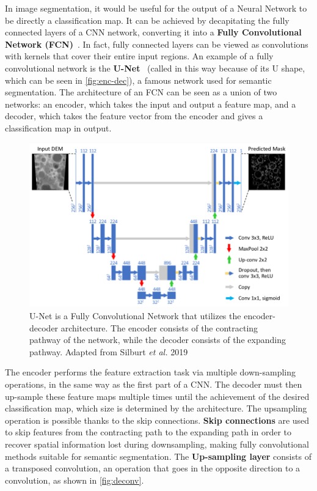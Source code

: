 \noindent In image segmentation, it would be useful for the output of a Neural Network to be directly a classification map.
It can be achieved by decapitating the fully connected layers of a CNN network, converting it into a \textbf{Fully Convolutional Network (FCN)}~\cite{long2015fully}.
In fact, fully connected layers can be viewed as convolutions with kernels that cover their entire input regions.
An example of a fully convolutional network is the \textbf{U-Net}~\cite{ronneberger2015u} (called in this way because of its U shape, which can be seen in \autoref{fig:enc-dec}), a famous network used for semantic segmentation.
The architecture of an FCN can be seen as a union of two networks: an encoder, which takes the input and output a feature map, and a decoder, which takes the feature vector from the encoder and gives a classification map in output.

\begin{figure}[h]
	\centering
	\includegraphics[width=0.9\linewidth]{images/approaches/deep_learning/unet_arch.png}
	\caption{U-Net is a Fully Convolutional Network that utilizes the encoder-decoder architecture.
	The encoder consists of the contracting pathway of the network, while the decoder consists of the expanding pathway.
	Adapted from Silburt \textit{et al.} 2019~\cite{silburt2019lunar}}
	\label{fig:enc-dec}
\end{figure}

The encoder performs the feature extraction task via multiple down-sampling operations, in the same way as the first part of a CNN.
The decoder must then up-sample these feature maps multiple times until the achievement of the desired classification map, which size is determined by the architecture.
The upsampling operation is possible thanks to the skip connections.
\textbf{Skip connections} are used to skip features from the contracting path to the expanding path in order to recover spatial information lost during downsampling, making fully convolutional methods suitable for semantic segmentation.
The \textbf{Up-sampling layer} consists of a transposed convolution, an operation that goes in the opposite direction to a convolution, as shown in \autoref{fig:deconv}.


